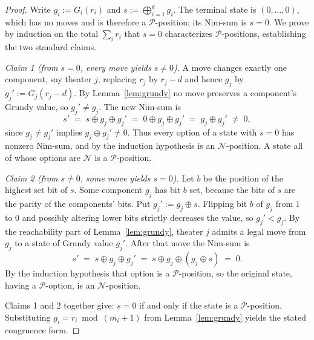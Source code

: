 \documentclass[10pt,a4paper]{amsart}
\begin{document}
\begin{proof}
Write $g_i := G_i(r_i)$ and $s := \bigoplus_{i=1}^{k} g_i$. The terminal
state is $(0,\dots,0)$, which has no moves and is therefore a
$\mathcal{P}$-position; its Nim-sum is $s=0$. We prove by induction on the
total $\sum_i r_i$ that $s=0$ characterizes $\mathcal{P}$-positions,
establishing the two standard claims.

\emph{Claim 1 (from $s=0$, every move yields $s\neq 0$).}
A move changes exactly one component, say theater $j$, replacing $r_j$ by
$r_j-d$ and hence $g_j$ by $g_j':=G_j(r_j-d)$. By Lemma~\ref{lem:grundy} no
move preserves a component's Grundy value, so $g_j'\neq g_j$. The new
Nim-sum is
\[
  s' \;=\; s \oplus g_j \oplus g_j' \;=\; 0 \oplus g_j \oplus g_j'
       \;=\; g_j \oplus g_j' \;\neq\; 0,
\]
since $g_j\neq g_j'$ implies $g_j\oplus g_j'\neq 0$. Thus every option of a
state with $s=0$ has nonzero Nim-sum, and by the induction hypothesis is
an $\mathcal{N}$-position. A state all of whose options are
$\mathcal{N}$ is a $\mathcal{P}$-position.

\emph{Claim 2 (from $s\neq 0$, some move yields $s=0$).}
Let $b$ be the position of the highest set bit of $s$. Some component $g_j$
has bit $b$ set, because the bits of $s$ are the parity of the components'
bits. Put $g_j' := g_j \oplus s$. Flipping bit $b$ of $g_j$ from $1$ to $0$
and possibly altering lower bits strictly decreases the value, so
$g_j' < g_j$. By the reachability part of Lemma~\ref{lem:grundy}, theater
$j$ admits a legal move from $g_j$ to a state of Grundy value $g_j'$.
After that move the Nim-sum is
\[
  s' \;=\; s \oplus g_j \oplus g_j'
       \;=\; s \oplus g_j \oplus (g_j \oplus s) \;=\; 0 .
\]
By the induction hypothesis that option is a $\mathcal{P}$-position, so the
original state, having a $\mathcal{P}$-option, is an
$\mathcal{N}$-position.

Claims 1 and 2 together give: $s=0$ if and only if the state is a
$\mathcal{P}$-position. Substituting $g_i=r_i\bmod(m_i+1)$ from
Lemma~\ref{lem:grundy} yields the stated congruence form.
\end{proof}
\end{document}
